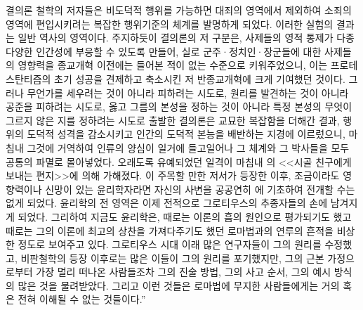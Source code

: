결의론 철학의 저자들은
비도덕적 행위를 가능하면 대죄의 영역에서 제외하여
소죄의 영역에 편입시키려는 복잡한 행위기준의 체계를 발명하게 되었다.
이러한 실험의 결과는 일반 역사의 영역이다.
주지하듯이 결의론의 저 구분은,
사제들의 영적 통제가 다종다양한 인간성에 부응할 수 있도록 만들어,
실로
군주^^b7정치인^^b7장군들에 대한
사제들의
영향력을
종교개혁 이전에는 들어본 적이 없는 수준으로
키워주었으니, 이는
프로테스탄티즘의 초기 성공을 견제하고 축소시킨
저 반종교개혁에 크게 기여했던 것이다.
그러나 무언가를 세우려는 것이 아니라 피하려는 시도로,
원리를 발견하는 것이 아니라 공준을 피하려는 시도로,
옳고 그름의 본성을 정하는 것이 아니라
특정 본성의 무엇이 그르지 않은 지를 정하려는 시도로
출발한 결의론은
교묘한 복잡함을 더해간 결과,
행위의 도덕적 성격을 감소시키고
인간의 도덕적 본능을 배반하는 지경에 이르렀으니,
마침내 그것에 거역하여 인류의 양심이 일거에 들고일어나
그 체계와 그 박사들을 모두 공통의 파멸로 몰아넣었다.
오래도록 유예되었던 일격이 마침내 의
<<시골 친구에게 보내는 편지>>에 의해
가해졌다.
이 주목할 만한 저서가 등장한 이후,
조금이라도 영향력이나 신망이 있는 윤리학자라면
자신의 사변을 공공연히 에 기초하여 전개할 수는 없게 되었다.
윤리학의 전 영역은 이제 전적으로
그로티우스의 추종자들의 손에 남겨지게 되었다.
그리하여 지금도 윤리학은,
때로는  이론의 흠의 원인으로 평가되기도 했고
때로는 그의 이론에 최고의 상찬을 가져다주기도 했던
로마법과의 연루의 흔적을
비상한 정도로 보여주고 있다.
그로티우스 시대 이래 많은 연구자들이 그의 원리를 수정했고,
비판철학의 등장 이후로는 많은 이들이 그의 원리를 포기했지만,
그의 근본 가정으로부터 가장 멀리 떠나온 사람들조차
그의 진술 방법, 그의 사고 순서, 그의 예시 방식의 많은 것을
물려받았다.
그리고 이런 것들은 로마법에 무지한 사람들에게는 거의 혹은 전혀
이해될 수 없는 것들이다.''

